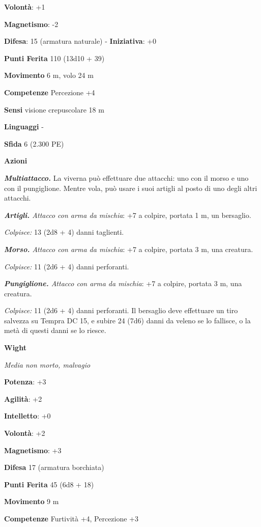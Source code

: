 \begin{multicols}{2}
\textbf{Volontà}: +1

\textbf{Magnetismo}: -2

\textbf{Difesa}: 15 (armatura naturale) - \textbf{Iniziativa}: +0

\textbf{Punti Ferita} 110 (13d10 + 39)

\textbf{Movimento} 6 m, volo 24 m

\textbf{Competenze} Percezione +4

\textbf{Sensi} visione crepuscolare 18 m

\textbf{Linguaggi} -

\textbf{Sfida} 6 (2.300 PE)\smallskip

\smallskip\textbf{Azioni}

\emph{\textbf{Multiattacco.}} La viverna può effettuare due attacchi:
uno con il morso e uno con il pungiglione. Mentre vola, può usare i suoi
artigli al posto di uno degli altri attacchi.

\emph{\textbf{Artigli.} Attacco con arma da mischia}: +7 a colpire,
portata 1 m, un bersaglio.

\emph{Colpisce:} 13 (2d8 + 4) danni taglienti.

\emph{\textbf{Morso.} Attacco con arma da mischia}: +7 a colpire,
portata 3 m, una creatura.

\emph{Colpisce:} 11 (2d6 + 4) danni perforanti.

\emph{\textbf{Pungiglione.} Attacco con arma da mischia}: +7 a colpire,
portata 3 m, una creatura.

\emph{Colpisce:} 11 (2d6 + 4) danni perforanti. Il bersaglio deve
effettuare un tiro salvezza su Tempra DC 15, e subire 24 (7d6)
danni da veleno se lo fallisce, o la metà di questi danni se lo riesce.



\textbf{Wight}

\emph{Media non morto, malvagio}

\textbf{Potenza}: +3

\textbf{Agilità}: +2

\textbf{Intelletto}: +0

\textbf{Volontà}: +2

\textbf{Magnetismo}: +3

\textbf{Difesa} 17 (armatura borchiata)

\textbf{Punti Ferita} 45 (6d8 + 18)

\textbf{Movimento} 9 m

\textbf{Competenze} Furtività +4, Percezione +3


\end{multicols}
